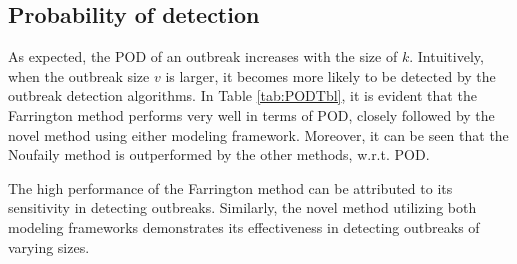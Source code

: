 \documentclass[preprint, 3p, authoryear]{elsarticle} %
\begin{document}
\hypertarget{probability-of-detection}{%
\subsection{Probability of detection}\label{probability-of-detection}}

As expected, the POD of an outbreak increases with the size of \(k\). Intuitively, when the outbreak size \(v\) is larger, it becomes more likely to be detected by the outbreak detection algorithms. In Table \ref{tab:PODTbl}, it is evident that the Farrington method performs very well in terms of POD, closely followed by the novel method using either modeling framework. Moreover, it can be seen that the Noufaily method is outperformed by the other methods, w.r.t. POD.

The high performance of the Farrington method can be attributed to its sensitivity in detecting outbreaks. Similarly, the novel method utilizing both modeling frameworks demonstrates its effectiveness in detecting outbreaks of varying sizes.
\end{document}
